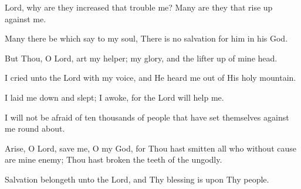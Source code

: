 Lord, why are they increased that trouble me? Many are they that rise up against me.

Many there be which say to my soul, There is no salvation for him in his God.

But Thou, O Lord, art my helper; my glory, and the lifter up of mine head.

I cried unto the Lord with my voice, and He heard me out of His holy mountain.

I laid me down and slept; I awoke, for the Lord will help me.

I will not be afraid of ten thousands of people that have set themselves against me round about.

Arise, O Lord, save me, O my God, for Thou hast smitten all who without cause are mine enemy; Thou hast broken the teeth of the ungodly.

Salvation belongeth unto the Lord, and Thy blessing is upon Thy people.
